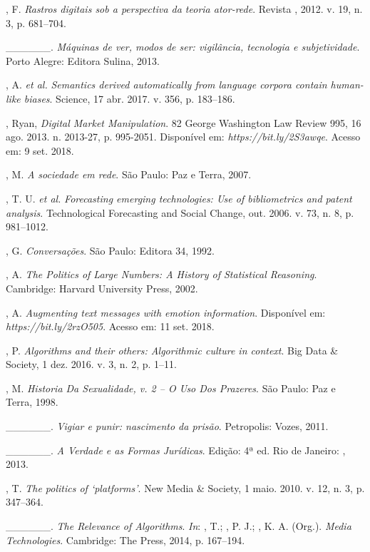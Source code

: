 , F. \emph{Rastros digitais sob a perspectiva da teoria
ator-rede}. Revista , 2012. v. 19, n. 3, p. 681--704.

\_\_\_\_\_\_. \emph{Máquinas de ver, modos de ser: vigilância,
tecnologia e subjetividade}. Porto Alegre: Editora Sulina, 2013.

, A. \emph{et al.} \emph{Semantics derived automatically from
language corpora contain human-like biases}. Science, 17 abr. 2017. v.
356, p. 183--186.

, Ryan, \emph{Digital Market Manipulation}. 82 George Washington
Law Review 995, 16 ago. 2013. n. 2013-27, p. 995-2051. Disponível em:
\emph{https://bit.ly/2S3awqe}. Acesso em: 9 set. 2018.

, M. \emph{A sociedade em rede}. São Paulo: Paz e Terra, 2007.

, T. U. \emph{et al.} \emph{Forecasting emerging technologies: Use
of bibliometrics and patent analysis}. Technological Forecasting and
Social Change, out. 2006. v. 73, n. 8, p. 981--1012.

, G. \emph{Conversações}. São Paulo: Editora 34, 1992.

, A. \emph{The Politics of Large Numbers: A History of
Statistical Reasoning}. Cambridge: Harvard University Press, 2002.

, A. \emph{Augmenting text messages with emotion information}.
Disponível em: \emph{https://bit.ly/2rzO505}. Acesso em: 11 set. 2018.

, P. \emph{Algorithms and their others: Algorithmic culture in
context}. Big Data \& Society, 1 dez. 2016. v. 3, n. 2, p. 1--11.

, M. \emph{Historia Da Sexualidade, v. 2 -- O Uso Dos Prazeres}.
São Paulo: Paz e Terra, 1998.

\_\_\_\_\_\_. \emph{Vigiar e punir: nascimento da prisão}. Petropolis:
Vozes, 2011.

\_\_\_\_\_\_. \emph{A Verdade e as Formas Jurídicas}. Edição:
4ª ed. Rio de Janeiro: , 2013.

, T. \emph{The politics of `platforms'}. New Media \&
Society, 1 maio. 2010. v. 12, n. 3, p. 347--364.

\_\_\_\_\_\_. \emph{The Relevance of Algorithms}. \emph{In}:
, T.; , P. J.; , K. A. (Org.). \emph{Media
Technologies}. Cambridge: The  Press, 2014, p. 167--194.

